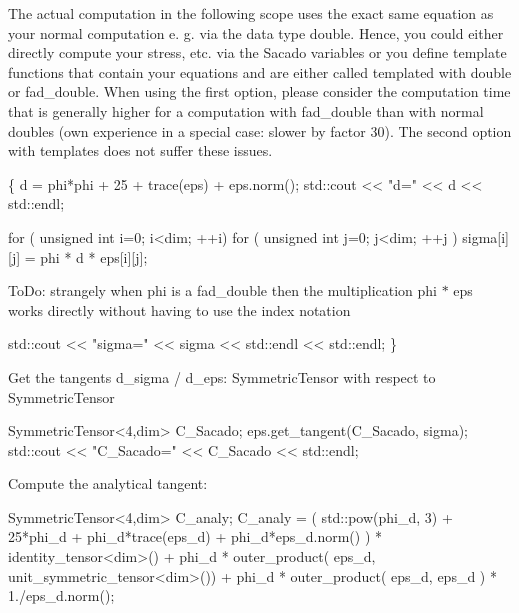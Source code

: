 The actual computation in the following scope uses the exact same equation as your normal computation e. g. via the data type double. Hence, you could either directly compute your stress, etc. via the Sacado variables or you define template functions that contain your equations and are either called templated with double or fad\+\_\+double. When using the first option, please consider the computation time that is generally higher for a computation with fad\+\_\+double than with normal doubles (own experience in a special case\+: slower by factor 30). The second option with templates does not suffer these issues. 
\begin{DoxyCode}
\{
d = phi*phi + 25 + trace(eps) + eps.norm();
std::cout << \textcolor{stringliteral}{"d="} << d << std::endl;

\textcolor{keywordflow}{for} ( \textcolor{keywordtype}{unsigned} \textcolor{keywordtype}{int} i=0; i<dim; ++i)
  \textcolor{keywordflow}{for} ( \textcolor{keywordtype}{unsigned} \textcolor{keywordtype}{int} j=0; j<dim; ++j )
      sigma[i][j] = phi * d * eps[i][j];
\end{DoxyCode}
 To\+Do\+: strangely when phi is a fad\+\_\+double then the multiplication phi $\ast$ eps works directly without having to use the index notation 
\begin{DoxyCode}
std::cout << \textcolor{stringliteral}{"sigma="} << sigma << std::endl << std::endl;
\}
\end{DoxyCode}
 Get the tangents d\+\_\+sigma / d\+\_\+eps\+: Symmetric\+Tensor with respect to Symmetric\+Tensor 
\begin{DoxyCode}
SymmetricTensor<4,dim> C\_Sacado;
eps.get\_tangent(C\_Sacado, sigma);
std::cout << \textcolor{stringliteral}{"C\_Sacado="} << C\_Sacado << std::endl;
\end{DoxyCode}
 Compute the analytical tangent\+: 
\begin{DoxyCode}
SymmetricTensor<4,dim> C\_analy;
C\_analy = ( std::pow(phi\_d, 3) + 25*phi\_d + phi\_d*trace(eps\_d) + phi\_d*eps\_d.norm() ) * 
      identity\_tensor<dim>()
          + phi\_d * outer\_product( eps\_d, unit\_symmetric\_tensor<dim>())
          + phi\_d * outer\_product( eps\_d, eps\_d ) * 1./eps\_d.norm();
\end{DoxyCode}
